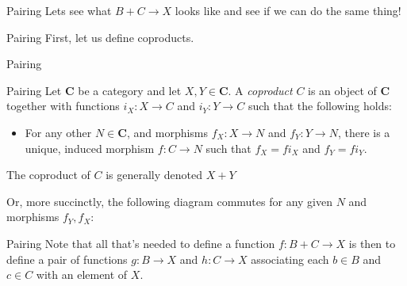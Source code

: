 \documentclass[tikz]{beamer}
\theoremstyle{definition}
\newcommand{\cat}[1]{\mathbf{#1}}
\begin{document}
\begin{frame}{Pairing}
    Lets see what $B + C \to X$ looks like and see if we can do the same thing!
\end{frame}{}

\begin{frame}{Pairing}
    First, let us define coproducts.
\end{frame}{}

\begin{frame}{Pairing}
    \begin{definition}{Pairing}
        Let $\cat{C}$ be a category and let $X, Y \in \cat{C}$. A \textit{coproduct} $C$ is an object of $\cat{C}$ together with functions $i_X : X \to C$ and $i_Y: Y \to C$ such that the following holds:

        \begin{itemize}
            \item For any other $N \in \cat{C}$, and morphisms $f_X: X \to N$ and $f_Y: Y \to N$, there is a unique, induced morphism $f: C \to N$ such that $f_X = fi_X$ and $f_Y = fi_Y$.
        \end{itemize}
    \end{definition}{}

    The coproduct of $C$ is generally denoted $X + Y$
\end{frame}{}

\begin{frame}[fragile]
    Or, more succinctly, the following diagram commutes for any given $N$ and morphisms $f_Y, f_X$:

\begin{center}
    {}
\end{center}

\end{frame}

\begin{frame}{Pairing}
    Note that all that's needed to define a function $f: B + C \to X$ is then to define a pair of functions $g: B \to X$ and $h: C \to X$ associating each $b \in B$ and $c \in C$ with an element of $X$.

\end{frame}
\end{document}
